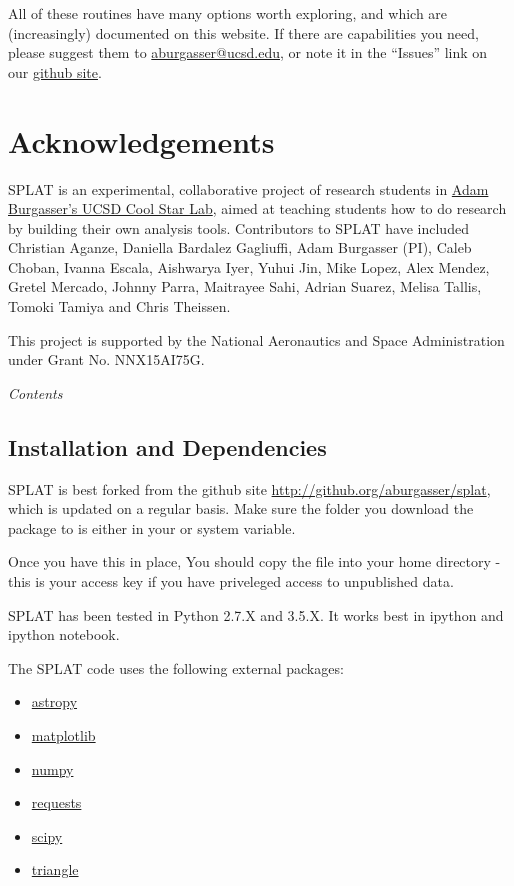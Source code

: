 \documentclass[letterpaper,10pt,english]{sphinxmanual}
\begin{document}
All of these routines have many options worth exploring, and which are (increasingly) documented on this website. If there are capabilities
you need, please suggest them to \href{mailto:aburgasser@ucsd.edu}{aburgasser@ucsd.edu}, or note it in the ``Issues'' link on our \href{https://github.com/aburgasser/splat}{github site}.


\chapter{Acknowledgements}
\label{index:acknowledgements}
SPLAT is an experimental, collaborative project of research students in \href{http://www.coolstarlab.org}{Adam Burgasser's
UCSD Cool Star Lab}, aimed at teaching students how to do research by building their own analysis tools.  Contributors to SPLAT have included Christian Aganze, Daniella Bardalez Gagliuffi, Adam Burgasser (PI), Caleb Choban, Ivanna Escala, Aishwarya Iyer, Yuhui Jin, Mike Lopez, Alex Mendez, Gretel Mercado, Johnny Parra, Maitrayee Sahi, Adrian Suarez, Melisa Tallis, Tomoki Tamiya and Chris Theissen.

This project is supported by the National Aeronautics and Space Administration under Grant No. NNX15AI75G.

\emph{Contents}


\section{Installation and Dependencies}
\label{installation:installation-and-dependencies}\label{installation::doc}
SPLAT is best forked from the github site \url{http://github.org/aburgasser/splat},
which is updated on a regular basis. Make sure the folder you download the package to is either in your  or  system variable.

Once you have this in place, You should copy the file  into your home directory - this is your access key if you have priveleged access to unpublished data.

SPLAT has been tested in Python 2.7.X and 3.5.X. It works best in ipython and ipython notebook.

The SPLAT code uses the following external packages:
\begin{itemize}
\item {} 
\href{http://www.astropy.org/}{astropy}

\item {} 
\href{http://matplotlib.org/}{matplotlib}

\item {} 
\href{http://www.numpy.org/}{numpy}

\item {} 
\href{http://docs.python-requests.org/en/master/}{requests}

\item {} 
\href{https://www.scipy.org/}{scipy}

\item {} 
\href{https://pypi.python.org/pypi/triangle\_plot}{triangle}

\end{itemize}
\end{document}
